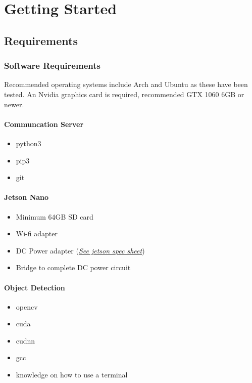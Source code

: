 \chapter{Getting Started}

\section{Requirements}
\subsection{Software Requirements}

Recommended operating systems include Arch and Ubuntu as these have been tested.
\newline
An Nvidia graphics card is required, recommended GTX 1060 6GB or newer.

\subsubsection{Communcation Server}
\begin{itemize}
    \item python3
    \item pip3
    \item git
\end{itemize}

\subsubsection{Jetson Nano}
\begin{itemize}
    \item Minimum 64GB SD card
    \item Wi-fi adapter
    \item DC Power adapter (\href{https://www.docdroid.net/yGXIxZu/data-sheet-nvidia-jetson-tx2-system-on-module.pdf}{\textit{See jetson spec sheet}})
    \item Bridge to complete DC power circuit
\end{itemize}

\subsubsection{Object Detection \cite{darknet}}
\begin{itemize}
    \item opencv
    \item cuda
    \item cudnn
    \item gcc
    \item knowledge on how to use a terminal
\end{itemize}

